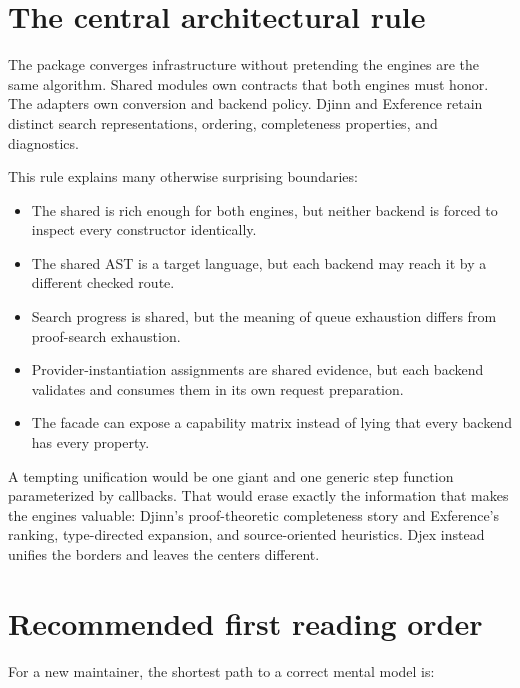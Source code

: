 \documentclass[10pt,letterpaper,oneside]{report}
\newcommand{\code}[1]{\texttt{\detokenize{#1}}}
\begin{document}
\section{The central architectural rule}

The package converges infrastructure without pretending the engines are the same algorithm. Shared modules own contracts that both engines must honor. The adapters own conversion and backend policy. Djinn and Exference retain distinct search representations, ordering, completeness properties, and diagnostics.

This rule explains many otherwise surprising boundaries:

\begin{itemize}
  \item The shared \code{Type} is rich enough for both engines, but neither backend is forced to inspect every constructor identically.
  \item The shared \code{Generated} AST is a target language, but each backend may reach it by a different checked route.
  \item Search progress is shared, but the meaning of queue exhaustion differs from proof-search exhaustion.
  \item Provider-instantiation assignments are shared evidence, but each backend validates and consumes them in its own request preparation.
  \item The facade can expose a capability matrix instead of lying that every backend has every property.
\end{itemize}

\begin{designbox}
A tempting unification would be one giant \code{SearchState} and one generic step function parameterized by callbacks. That would erase exactly the information that makes the engines valuable: Djinn's proof-theoretic completeness story and Exference's ranking, type-directed expansion, and source-oriented heuristics. Djex instead unifies the borders and leaves the centers different.
\end{designbox}

\section{Recommended first reading order}

For a new maintainer, the shortest path to a correct mental model is:
\end{document}
